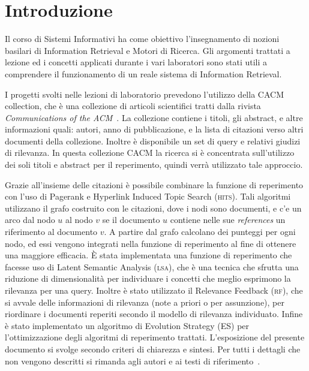\section{Introduzione}
\label{sec:introduzione}

Il corso di Sistemi Informativi ha come obiettivo l'insegnamento di nozioni basilari di Information Retrieval e Motori di Ricerca. Gli argomenti trattati a lezione ed i concetti applicati durante i vari laboratori sono stati utili a comprendere il funzionamento di un reale sistema di Information Retrieval.

I progetti svolti nelle lezioni di laboratorio prevedono l'utilizzo della CACM collection, che \`e una collezione di articoli scientifici tratti dalla rivista \textit{Communications of the ACM}~\cite{ACMCollection}. La collezione contiene i titoli, gli abstract, e altre informazioni quali: autori, anno di pubblicazione, e la lista di citazioni verso altri documenti della collezione. Inoltre \`e disponibile un set di query e relativi giudizi di rilevanza. In questa collezione CACM la ricerca si \`e concentrata sull'utilizzo dei soli titoli e abstract per il reperimento, quindi verr\`a utilizzato tale approccio. 

Grazie all'insieme delle citazioni \`e possibile combinare la funzione di reperimento con l'uso di Pagerank e Hyperlink Induced Topic Search (\textsc{hits}). Tali algoritmi utilizzano il grafo costruito con le citazioni, dove i nodi sono  documenti, e c'e un arco dal nodo $u$ al nodo $v$ se il documento $u$ contiene nelle sue \textit{references} un riferimento al documento $v$. A partire dal grafo calcolano dei punteggi per ogni nodo, ed essi vengono integrati nella funzione di reperimento al fine di ottenere una maggiore efficacia. 
\`E stata implementata una funzione di reperimento che facesse uso di Latent Semantic Analysis (\textsc{lsa}), che \`e una tecnica che sfrutta una riduzione di dimensionalit\`a per individuare i concetti che meglio esprimono la rilevanza per una query. Inoltre \`e stato utilizzato il Relevance Feedback (\textsc{rf}), che si avvale delle informazioni di rilevanza (note a priori o per assunzione), per riordinare i documenti reperiti secondo il modello di rilevanza individuato.
Infine \`e stato implementato un algoritmo di Evolution Strategy (ES) per l'ottimizzazione degli algoritmi di reperimento trattati. L'esposizione del presente documento si svolge secondo criteri di chiarezza e sintesi. Per tutti i dettagli che non vengono descritti si rimanda agli autori e ai testi di riferimento~\cite{manning2008introduction,melucci2013information,croft2010search}.

